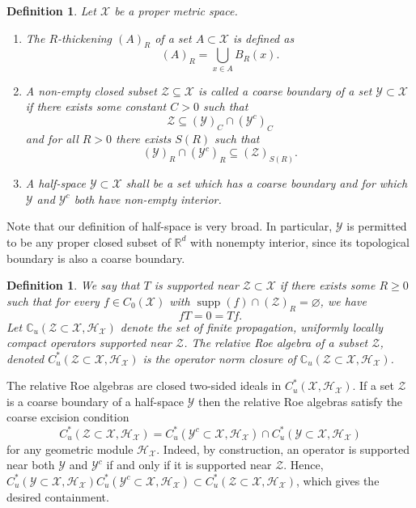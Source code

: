 \documentclass[12pt]{amsart}
\newtheorem{definition}[theorem]{Definition}
\newcommand{\CM}{{\mathbb C}}
\newcommand{\RM}{{\mathbb R}}
\newcommand{\Hh}{{\mathcal H}}
\newcommand{\Xx}{{\mathcal X}}
\newcommand{\Yy}{{\mathcal Y}}
\newcommand{\Zz}{{\mathcal Z}}
\DeclareMathOperator{\supp}{supp}
\begin{document}
\begin{definition}\label{defn:relative_roe}
Let $\Xx$ be a proper metric space.
\begin{enumerate}
\item[(i)] The $R$-thickening $(A)_R$ of a set $A\subset \Xx$ is defined as
\[(A)_R = \bigcup_{x\in A} B_R(x).\]

\item[(ii)] A non-empty closed subset $\Zz \subseteq \Xx$ is called a coarse boundary of a set $\Yy\subset \Xx$ if there exists some constant $C>0$ such that \[\Zz \subseteq (\Yy)_C \cap (\Yy^c)_C\] and for all $R > 0$ there exists $S(R)$ such that 
\[(\Yy)_R \cap (\Yy^c)_R \subseteq (\Zz)_{S(R)}.\]
\item[(iii)] A half-space $\Yy\subset \Xx$ shall be a set which has a coarse boundary and for which $\Yy$ and $\Yy^c$ both have non-empty interior. 
\end{enumerate}
\end{definition}
Note that our definition of half-space is very broad. In particular, $\Yy$ is permitted to be any proper closed subset of $\RM^d$ with nonempty interior, since its topological boundary is also a coarse boundary.
\begin{definition}
We say that $T$ is supported near $\Zz\subset \Xx$ if there exists some $R \geq 0$ such that for every $f\in C_0(\Xx)$ with $\supp(f) \cap (\Zz)_R=\varnothing$, we have 
\[f T = 0 = Tf.\]
Let $\CM_u(\Zz\subset \Xx, \Hh_\Xx)$ denote the set of finite propagation, uniformly locally compact operators supported near $\Zz$. The relative Roe algebra of a subset $\Zz$, denoted $C^*_u(\Zz \subset \Xx, \Hh_\Xx)$ is the operator norm closure of $\CM_u(\Zz\subset \Xx,\Hh_\Xx)$. 
\end{definition}
The relative Roe algebras are closed two-sided ideals in $C^*_u(\Xx, \Hh_\Xx)$.
If a set $\Zz$ is a coarse boundary of a half-space $\Yy$ then the relative Roe algebras satisfy the coarse excision condition
\begin{equation}
\label{eq:coarse_excision}
C^*_u(\Zz\subset \Xx, \Hh_\Xx)=C^*_u(\Yy^c \subset \Xx, \Hh_\Xx)\cap C^*_u(\Yy\subset \Xx, \Hh_\Xx)
\end{equation}
for any geometric module $\Hh_\Xx$.
Indeed, by construction, an operator is supported near both $\Yy$ and $\Yy^c$ if and only if it is supported near $\Zz$.
Hence, $C^*_u(\Yy \subset \Xx,\Hh_\Xx) C^*_u(\Yy^c \subset \Xx,\Hh_\Xx) \subset C^*_u(\Zz \subset \Xx,\Hh_\Xx)$, which gives the desired containment.
\end{document}
